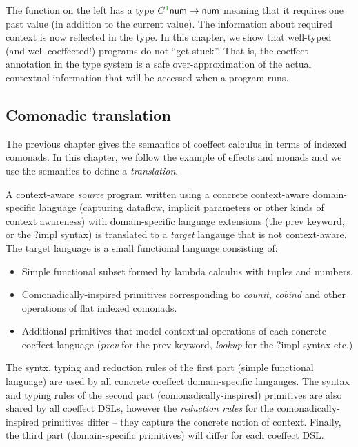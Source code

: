 \documentclass[
		twoside,openright,titlepage,numbers=noenddot,headinclude,%
                footinclude=true,cleardoublepage=empty,
                BCOR=10mm,paper=a4,fontsize=10pt, %
                ngerman,american, %
                ]{scrreprt}
\newcommand{\kvd}[1]{\textnormal{\textcolor{kvdclr}{\ttfamily #1}}}
\newcommand{\ident}[1]{\textnormal{\sffamily #1}}
\newcommand{\ctyp}[2]{C^{#1}#2}
\newcommand{\cclrd}[1]{\textcolor{cclr}{#1}}
\begin{document}
The function on the left has a type $\ctyp{\cclrd{1}}\ident{num}\rightarrow\ident{num}$ meaning 
that it requires one past value (in addition to the current value). The information about required
context is now reflected in the type. In this chapter, we show that well-typed (and well-coeffected!) 
programs do not ``get stuck''. That is, the coeffect annotation in the type system is a safe
over-approximation of the actual contextual information that will be accessed when a program runs.


\subsection{Comonadic translation}

The previous chapter gives the semantics of coeffect calculus in terms of indexed comonads. In this
chapter, we follow the example of effects and monads and we use the semantics to define a 
\emph{translation}.

A context-aware \emph{source} program written using a concrete context-aware domain-specific 
language (capturing dataflow, implicit parameters or other kinds of context awareness) with
domain-specific language extensions (the \kvd{prev} keyword, or the \ident{?impl} syntax)
is translated to a \emph{target} langauge that is not context-aware. The target language is
a small functional language consisting of:
%
\begin{itemize}
  \item Simple functional subset formed by lambda calculus with tuples and numbers.
  \item Comonadically-inspired primitives corresponding to \emph{counit}, \emph{cobind} and
    other operations of flat indexed comonads.
  \item Additional primitives that model contextual operations of each concrete coeffect language
    (\emph{prev} for the \kvd{prev} keyword, \emph{lookup} for the \ident{?impl} syntax etc.)
\end{itemize}
%
The syntx, typing and reduction rules of the first part (simple functional language) are used by 
all concrete coeffect domain-specific langauges. The syntax and typing rules of the second part 
(comonadically-inspired) primitives are also shared by all coeffect DSLs, however the \emph{reduction
rules} for the comonadically-inspired primitives differ -- they capture the concrete notion of
context. Finally, the third part (domain-specific primitives) will differ for each coeffect DSL.
\end{document}
